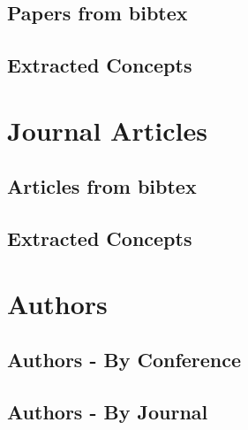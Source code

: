 \documentclass[a4paper]{article}
\begin{document}
\clearpage
\subsection{Papers from bibtex}


\clearpage
\subsection{Extracted Concepts}


%

\clearpage
\section{Journal Articles}

\clearpage
\subsection{Articles from bibtex}



\clearpage
\subsection{Extracted Concepts}


%

\clearpage
\section{Authors}



\subsection{Authors - By Conference}



\subsection{Authors - By Journal}
\end{document}
